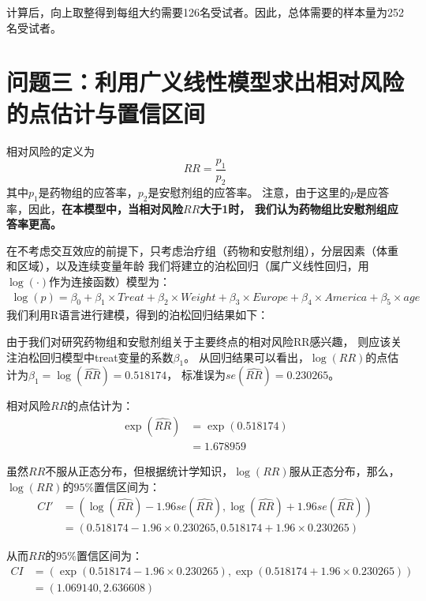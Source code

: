 \documentclass{article}
\begin{document}
计算后，向上取整得到每组大约需要126名受试者。因此，总体需要的样本量为252名受试者。






\section{问题三：利用广义线性模型求出相对风险的点估计与置信区间}
相对风险的定义为
\[RR = \frac{p_1}{p_2}\]
其中$p_1$是药物组的应答率，$p_2$是安慰剂组的应答率。
注意，由于这里的$p$是应答率，因此，\textbf{在本模型中，当相对风险$RR$大于1时，
我们认为药物组比安慰剂组应答率更高。}

在不考虑交互效应的前提下，只考虑治疗组（药物和安慰剂组），分层因素（体重和区域），以及连续变量年龄
我们将建立的泊松回归（属广义线性回归，用$\log(\cdot)$作为连接函数）模型为：
\begin{align*}
    \log(p) = \beta_0 + \beta_1 \times Treat + \beta_2 \times Weight + \beta_3 \times Europe + 
    \beta_4 \times America + \beta_5 \times age
\end{align*}
我们利用R语言进行建模，得到的泊松回归结果如下：


由于我们对研究药物组和安慰剂组关于主要终点的相对风险RR感兴趣，
则应该关注泊松回归模型中treat变量的系数$\beta_1$。
从回归结果可以看出，$\log(RR)$的点估计为$\beta_1=\log(\hat{RR})=0.518174$，
标准误为$se(\hat{RR}) = 0.230265$。

相对风险$RR$的点估计为：
\begin{align*}
\exp(\hat{RR})&=\exp(0.518174)\\
&=1.678959
\end{align*}

虽然$RR$不服从正态分布，但根据统计学知识，$\log(RR)$服从正态分布，那么，
$\log(RR)$的$95\%$置信区间为：
\begin{align*}
CI' &= (   \log(\hat{RR})-1.96se(\hat{RR}), \log(\hat{RR})+1.96se(\hat{RR})) \\
&=(0.518174-1.96\times0.230265, 0.518174+1.96\times0.230265)
\end{align*}

从而$RR$的$95\%$置信区间为：
\begin{align*}
CI &= (\exp(0.518174-1.96\times0.230265), \exp(0.518174+1.96\times0.230265))\\
& = (1.069140,2.636608)
\end{align*}
\end{document}
